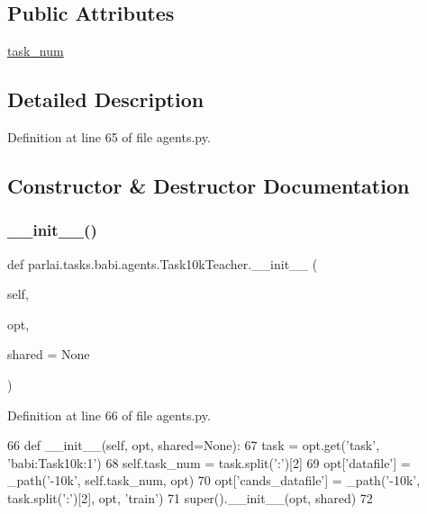 \subsection*{Public Attributes}
\begin{DoxyCompactItemize}
\item 
\hyperlink{classparlai_1_1tasks_1_1babi_1_1agents_1_1Task10kTeacher_a71c66ccc1c27b22f0e49863c0926d59c}{task\+\_\+num}
\end{DoxyCompactItemize}


\subsection{Detailed Description}


Definition at line 65 of file agents.\+py.



\subsection{Constructor \& Destructor Documentation}
\mbox{\label{classparlai_1_1tasks_1_1babi_1_1agents_1_1Task10kTeacher_a2a37e51cf3bf8c1248b60a211aaa4081}} 
\subsubsection{\texorpdfstring{\+\_\+\+\_\+init\+\_\+\+\_\+()}{\_\_init\_\_()}}
{\footnotesize\ttfamily def parlai.\+tasks.\+babi.\+agents.\+Task10k\+Teacher.\+\_\+\+\_\+init\+\_\+\+\_\+ (\begin{DoxyParamCaption}\item[{}]{self,  }\item[{}]{opt,  }\item[{}]{shared = {\ttfamily None} }\end{DoxyParamCaption})}



Definition at line 66 of file agents.\+py.


\begin{DoxyCode}
66     \textcolor{keyword}{def }\_\_init\_\_(self, opt, shared=None):
67         task = opt.get(\textcolor{stringliteral}{'task'}, \textcolor{stringliteral}{'babi:Task10k:1'})
68         self.task\_num = task.split(\textcolor{stringliteral}{':'})[2]
69         opt[\textcolor{stringliteral}{'datafile'}] = \_path(\textcolor{stringliteral}{'-10k'}, self.task\_num, opt)
70         opt[\textcolor{stringliteral}{'cands\_datafile'}] = \_path(\textcolor{stringliteral}{'-10k'}, task.split(\textcolor{stringliteral}{':'})[2], opt, \textcolor{stringliteral}{'train'})
71         super().\_\_init\_\_(opt, shared)
72 
\end{DoxyCode}


